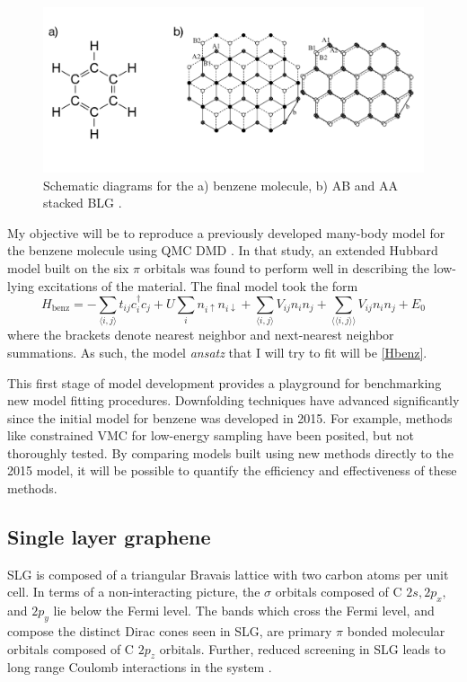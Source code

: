 \documentclass[12pt]{article}
\begin{document}
\begin{figure}
\centering
\includegraphics[width=1.0\linewidth]{./figs/proposed.pdf}
\caption{Schematic diagrams for the a) benzene molecule, b) AB and AA stacked BLG \cite{doi:10.1063/1.5007713}.}
\label{fig:proposed}
\end{figure}

My objective will be to reproduce a previously developed many-body model for the benzene molecule using QMC DMD \cite{Wagner2015}.
In that study, an extended Hubbard model built on the six $\pi$ orbitals was found to perform well in describing the low-lying excitations of the material.
The final model took the form 
\begin{equation}
H_\text{benz} = -\sum_{\langle i,j \rangle} t_{ij}c_i^\dagger c_j + U \sum_i n_{i\uparrow}n_{i\downarrow}  + \sum_{\langle i,j \rangle}V_{ij} n_i n_j + \sum_{\langle \langle i,j \rangle\rangle}V_{ij} n_i n_j + E_0
\label{Hbenz}
\end{equation}
where the brackets denote nearest neighbor and next-nearest neighbor summations.
As such, the model \textit{ansatz} that I will try to fit will be \eqref{Hbenz}.

This first stage of model development provides a playground for benchmarking new model fitting procedures.
Downfolding techniques have advanced significantly since the initial model for benzene was developed in 2015.
For example, methods like constrained VMC for low-energy sampling have been posited, but not thoroughly tested.
By comparing models built using new methods directly to the 2015 model, it will be possible to quantify the efficiency and effectiveness of these methods.

\subsection{Single layer graphene}
SLG is composed of a triangular Bravais lattice with two carbon atoms per unit cell.
In terms of a non-interacting picture, the $\sigma$ orbitals composed of C $2s, 2p_x,$ and $2p_y$ lie below the Fermi level.
The bands which cross the Fermi level, and compose the distinct Dirac cones seen in SLG, are primary $\pi$ bonded molecular orbitals composed of C $2p_z$ orbitals.
Further, reduced screening in SLG leads to long range Coulomb interactions in the system \cite{Elias2012, Yu2013}.
\end{document}
